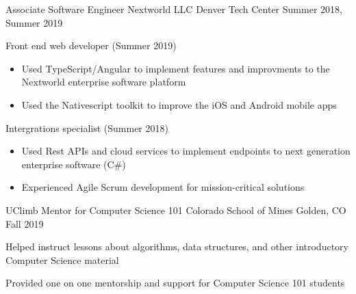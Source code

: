 \vspace{-2.0mm}

\begin{cventries}

  \cventry
    {Associate Software Engineer} %
    {Nextworld LLC} %
    {Denver Tech Center} %
    {Summer 2018, Summer 2019} %
    {
      \begin{cvitems} %
      \item {Front end web developer (Summer 2019)}
      \begin{itemize}
            \item {Used TypeScript/Angular to implement features and
    improvments to the Nextworld enterprise software platform}
        \item {Used the Nativescript toolkit to improve the iOS and
    Android mobile apps}
    \end{itemize}
        \item {Intergrations specialist (Summer 2018)}
        \begin{itemize}
                \item {Used Rest APIs and cloud services to implement
                            endpoints to next generation enterprise software (C\#)}
                                    \item {Experienced Agile Scrum
    development for mission-critical solutions}
    \end{itemize}
      \end{cvitems}
    }
    
    \cventry
    	{UClimb Mentor for Computer Science 101}
    	{ Colorado School of Mines }
    	{ Golden, CO}
	   	 {Fall 2019  }
   	 {
   	 \begin{cvitems}
   	 \item {Helped instruct lessons about algorithms, data structures, and other introductory Computer Science material}
   	 \item {Provided one on one mentorship and support for Computer Science 101 students}
    \end{cvitems}
    }
    

\end{cventries}
